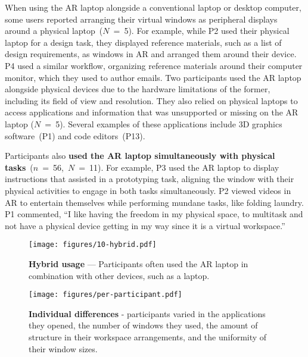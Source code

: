 When using the AR laptop alongside a conventional laptop or desktop computer, 
some users reported arranging their virtual windows as peripheral displays around a physical laptop~($N$~=~5).
For example, while P2 used their physical laptop for a design task, they displayed reference materials, such as a list of design requirements, as windows in AR and arranged them around their device.
P4 used a similar workflow, organizing reference materials around their computer monitor, which they used to author emails.
Two participants
used the AR laptop alongside physical devices due to the hardware limitations of the former, including its field of view and resolution.
They also relied on physical laptops to access applications and information that was unsupported or missing on the AR laptop ($N$~=~5).
Several examples of these applications include 3D graphics software~(P1) and code editors~(P13).

Participants also \textbf{used the AR laptop simultaneously with physical tasks}~($n$~=~56,~$N$~=~11). 
For example, P3 used the AR laptop to display instructions that assisted in a prototyping task, aligning the window with their physical activities to engage in both tasks simultaneously.
P2 viewed videos in AR to entertain themselves while performing mundane tasks, like folding laundry.
P1 commented, ``I like having the freedom in my physical space, to multitask and not have a physical device getting in my way since it is a virtual workspace.''

\begin{figure}[t]
    \centering
    \texttt{[image: figures/10-hybrid.pdf]}
    \caption{\textbf{Hybrid usage} --- Participants often used the AR laptop in combination with other devices, such as a laptop.}
    \label{fig:hybrid}
\end{figure}

\begin{figure*}[t]
    \centering
    \texttt{[image: figures/per-participant.pdf]}
    \caption{\textbf{Individual differences} - participants varied in the applications they opened, the number of windows they used, the amount of structure in their workspace arrangements, and the uniformity of their window sizes.}
    \label{fig:individual-diffs}
\end{figure*}

